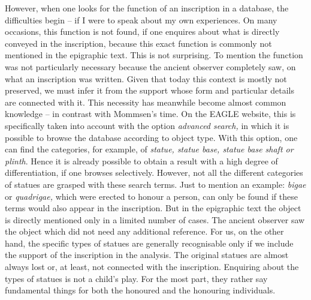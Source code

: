 \documentclass{article}
\begin{document}
However, when one looks for the function of an inscription in a database, the difficulties 
begin – if I were to speak about my own experiences. On many occasions, this 
function is not found, if one enquires about what is directly conveyed in the inscription, 
because this exact function is commonly not mentioned in the epigraphic text. This 
is not surprising. To mention the function was not particularly necessary because 
the ancient observer completely saw, on what an inscription was written. Given 
that today this context is mostly not preserved, we must infer it from the support 
whose form and particular details are connected with it. This necessity has meanwhile 
become almost common knowledge – in contrast with Mommsen's time. On the EAGLE 
website, this is specifically taken into account with the option \textit{advanced 
search, }in which it is possible to browse the database according to object type. 
With this option, one can find the categories, for example, of \textit{statue, 
statue base, statue base shaft or plinth}. Hence it is already possible to obtain 
a result with a high degree of differentiation, if one browses selectively. However, 
not all the different categories of statues are grasped with these search terms. 
Just to mention an example: \textit{bigae }or \textit{quadrigae, }which were erected 
to honour a person, can only be found if these terms would also appear in the inscription. 
But in the epigraphic text the object is directly mentioned only in a limited number 
of cases. The ancient observer saw the object which did not need any additional 
reference. For us, on the other hand, the specific types of statues are generally 
recognisable only if we include the support of the inscription in the analysis. 
The original statues are almost always lost or, at least, not connected with the 
inscription. Enquiring about the types of statues is not a child's play. For the 
most part, they rather say fundamental things for both the honoured and the honouring 
individuals. 
\end{document}
